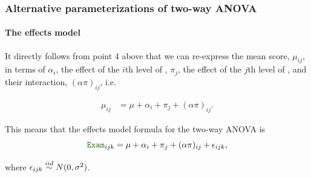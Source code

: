 \documentclass{beamer}\usepackage[]{graphicx}\usepackage[]{xcolor}
\begin{document}
\begin{frame}[fragile]
\frametitle{Alternative parameterizations of two-way ANOVA}
\framesubtitle{The effects model}

It directly follows from point 4 above that we can re-express the mean  score, $\mu_{ij}$, in terms of $\alpha_i$, the  effect of the $i$th level of , $\pi_j$, the effect of the $j$th level of , and their interaction, $(\alpha\pi)_{ij}$, i.e.

\vspace{-5.5mm}

\begin{align*}
   \mu_{ij} &= \mu + \alpha_i + \pi_j + (\alpha\pi)_{ij}.
\end{align*}

\vspace{-5.5mm}

This means that the effects model formula for the two-way ANOVA is
\[
\rcode{Exam}_{ijk} = \mu + \alpha_{i} + \pi_{j} + (\alpha\pi)_{ij} + \epsilon_{ijk},
\]

where $\epsilon_{ijk} \stackrel{iid}{\sim} N(0, \sigma^2)$.

\end{frame}
\end{document}
